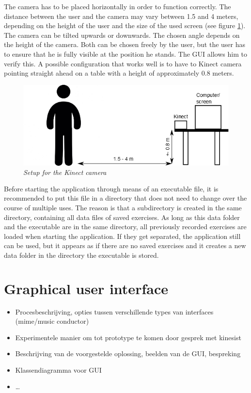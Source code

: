 The camera has to be placed horizontally in order to function correctly. The distance between the user and the camera may vary between 1.5 and 4 meters, depending on the height of the user and the size of the used screen (see figure \ref{fig: kinect_setup}). The camera can be tilted upwards or downwards. The chosen angle depends on the height of the camera. Both can be chosen freely by the user, but the user has to ensure that he is fully visible at the position he stands. The GUI allows him to verify this. A possible configuration that works well is to have to Kinect camera pointing straight ahead on a table with a height of approximately 0.8 meters.\\

\begin{figure}[H]
\begin{center}
\includegraphics[width=12cm]{SetupKinect.png}
\caption{\emph{Setup for the Kinect camera}}
\label{fig: kinect_setup}
\end{center}
\end{figure}

Before starting the application through means of an executable file, it is recommended to put this file in a directory that does not need to change over the course of multiple uses. The reason is that a subdirectory is created in the same directory, containing all data files of saved exercises. As long as this data folder and the executable are in the same directory, all previously recorded exercises are loaded when starting the application. If they get separated, the application still can be used, but it appears as if there are no saved exercises and it creates a new data folder in the directory the executable is stored.\\


\section{Graphical user interface}

\begin{itemize}
\item Procesbeschrijving, opties tussen verschillende types van interfaces (mime/music conductor)
\item Experimentele manier om tot prototype te komen door gesprek met kinesist
\item Beschrijving van de voorgestelde oplossing, beelden van de GUI, bespreking
\item Klassendiagramma voor GUI
\item \ldots
\end{itemize}

